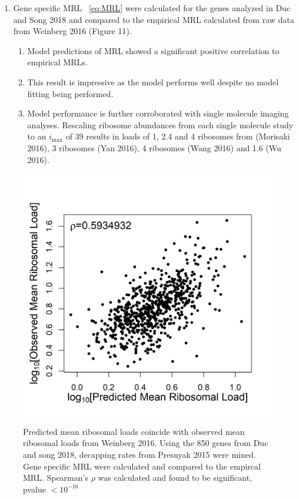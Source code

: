 \documentclass[review]{elsarticle}
\newcommand{\imax}{\ensuremath{{i_{\max}}}\xspace}
\begin{document}
\begin{enumerate}
\item Gene specific MRL ~\ref{eq:MRL} were calculated for the genes analyzed in Duc and Song 2018 and compared to the empirical MRL calculated from raw data from Weinberg 2016 (Figure 11).
\begin{enumerate}
  \item Model predictions of MRL showed a significant positive correlation to empirical MRLs.
  \item This result is impressive as the model performs well despite no model fitting being performed.
  \item  Model performance is further corroborated with single molecule imaging analyses. Rescaling ribosome abundances from each single molecule study to an \imax of 39 results in loads of 1, 2.4 and 4 ribosomes from (Morisaki 2016), 3 ribosomes (Yan 2016), 4 ribosomes (Wang 2016) and 1.6 (Wu 2016).
\end{enumerate}

\end{enumerate}


   
\begin{figure}[!ht]
\centering
\includegraphics[width=120mm]{Images/Duc_Song_vs_model_log.png}
\caption{Predicted mean ribosomal loads coincide with observed mean ribosomal loads from Weinberg 2016. Using the 850 genes from Duc and song 2018, decapping rates from Presnyak 2015 were mined. Gene specific MRL were calculated and compared to the empircal MRL. Spearman's $\rho$ was calculated and found to be significant, pvalue $<10^{-16}$}
\end{figure}
\clearpage 
\end{document}
